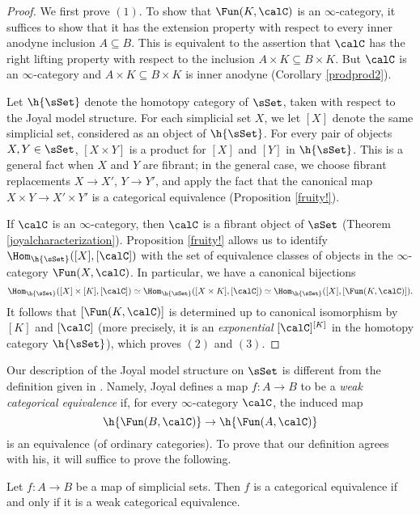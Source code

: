 \begin{proof}
We first prove $(1)$. To show that $\Fun(K,\calC)$ is an $\infty$-category, it
suffices to show that it has the extension property with respect
to every inner anodyne inclusion $A \subseteq B$. This is equivalent
to the assertion that $\calC$ has the right lifting property with
respect to the inclusion $A \times K \subseteq B \times K$. But
$\calC$ is an $\infty$-category and $A \times K \subseteq B \times K$ is
inner anodyne (Corollary \ref{prodprod2}).

Let $\h{\sSet}$ denote the homotopy category of $\sSet$, taken with respect to the Joyal model structure. For each simplicial set $X$, we let $[X]$ denote the same simplicial set, considered
as an object of $\h{\sSet}$. For every pair of objects $X, Y \in \sSet$, $[X \times Y]$ is a product
for $[X]$ and $[Y]$ in $\h{\sSet}$. This is a general fact when $X$
and $Y$ are fibrant; in the general case, we choose fibrant
replacements $X \rightarrow X'$, $Y \rightarrow Y'$, and apply the fact that
the canonical map $X \times Y \rightarrow X' \times Y'$ is a categorical equivalence (Proposition \ref{fruity!}). 

If $\calC$ is an $\infty$-category, then $\calC$ is a fibrant object
of $\sSet$ (Theorem \ref{joyalcharacterization}). Proposition \ref{fruity!} allows us to identify
$ \Hom_{ \h{\sSet}}( [X], [\calC] )$ with the set of equivalence classes of objects in
the $\infty$-category $\Fun(X, \calC)$. In particular, we have a canonical bijections
$$ \Hom_{\h{\sSet}}( [X] \times [K], [\calC] ) 
\simeq \Hom_{ \h{\sSet}}( [X \times K] , [\calC] )
\simeq \Hom_{\h{ \sSet}}( [X], [\Fun(K,\calC)]).$$ 
It follows that $[ \Fun(K, \calC) ]$ is determined up to canonical isomorphism by
$[K]$ and $[\calC]$ (more precisely, it is an {\em exponential} $[\calC]^{[K]}$ in the homotopy
category $\h{\sSet}$), which proves $(2)$ and $(3)$.
\end{proof}

Our description of the Joyal model structure on $\sSet$ is different from the definition given in \cite{joyalnotpub}. Namely, Joyal defines a map $f: A \rightarrow B$ to be a
{\it weak categorical equivalence} if, for every $\infty$-category $\calC$,
the induced map
$$ \h{\Fun(B, \calC)} \rightarrow \h{\Fun(A, \calC)}$$
is an equivalence (of ordinary categories). To prove that our definition agrees with his, it will suffice to prove the following.

\begin{proposition}\label{joyaldef}
Let $f: A \rightarrow B$ be a map of simplicial sets. Then $f$ is a categorical equivalence if and only if it is a weak categorical equivalence.
\end{proposition}

